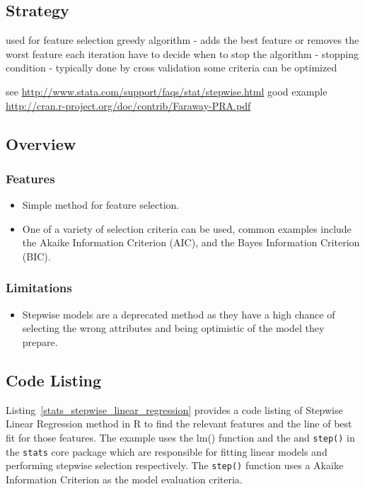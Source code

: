 \subsection{Strategy}

used for feature selection
greedy algorithm - adds the best feature or removes the worst feature each iteration
have to decide when to stop the algorithm - stopping condition - typically done by cross validation
some criteria can be optimized

see \url{http://www.stata.com/support/faqs/stat/stepwise.html}
good example \url{http://cran.r-project.org/doc/contrib/Faraway-PRA.pdf}

\subsection{Overview}

\subsubsection{Features}

\begin{itemize}
	\item Simple method for feature selection.
	\item One of a variety of selection criteria can be used, common examples include the Akaike Information Criterion (AIC), and the Bayes Information Criterion (BIC).
\end{itemize}

\subsubsection{Limitations}

\begin{itemize}
	\item Stepwise models are a deprecated method as they have a high chance of selecting the wrong attributes and being optimistic of the model they prepare.
\end{itemize}



\subsection{Code Listing}
Listing~\ref{stats_stepwise_linear_regression} provides a code listing of Stepwise Linear Regression method in R to find the relevant features and the line of best fit for those features.
The example uses the {lm()} function and the and \texttt{step()} in the \texttt{stats} core package which are responsible for fitting linear models and performing stepwise selection respectively. The \texttt{step()} function uses a Akaike Information Criterion as the model evaluation criteria.

